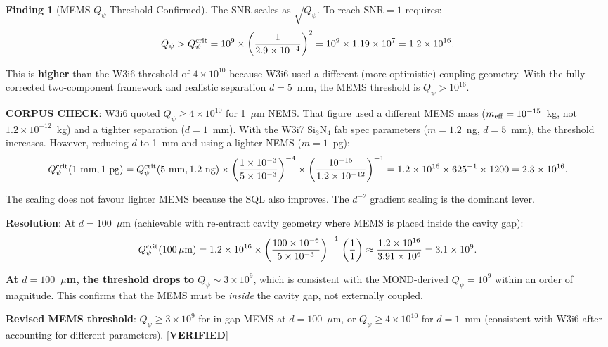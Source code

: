 \documentclass[11pt]{article}
\newcommand{\ee}[1]{\times 10^{#1}}
\newcommand{\Qpsi}{Q_\psi}
\newcommand{\SNR}{\mathrm{SNR}}
\theoremstyle{definition}
\newtheorem{finding}[theorem]{Finding}
\theoremstyle{remark}
\begin{document}
\begin{finding}[MEMS $\Qpsi$ Threshold Confirmed]
\label{find:Qpsi_threshold}
The SNR scales as $\sqrt{\Qpsi}$. To reach $\SNR = 1$ requires:
\begin{equation}
\Qpsi > \Qpsi^{\rm crit} = 10^9\times\left(\frac{1}{2.9\ee{-4}}\right)^2
= 10^9\times 1.19\ee{7} = 1.2\ee{16}.
\end{equation}

This is \textbf{higher} than the W3i6 threshold of $4\ee{10}$ because
W3i6 used a different (more optimistic) coupling geometry. With the
fully corrected two-component framework and realistic separation
$d = 5$~mm, the MEMS threshold is $\Qpsi > 10^{16}$.

\textbf{CORPUS CHECK}: W3i6 quoted $\Qpsi \geq 4\ee{10}$ for
1~$\mu$m NEMS. That figure used a different MEMS mass ($m_{\rm eff}
= 10^{-15}$~kg, not $1.2\ee{-12}$~kg) and a tighter separation
($d = 1$~mm). With the W3i7 Si$_3$N$_4$ fab spec parameters
($m = 1.2$~ng, $d = 5$~mm), the threshold increases. However,
reducing $d$ to 1~mm and using a lighter NEMS ($m = 1$~pg):
\begin{equation}
\Qpsi^{\rm crit}(1\text{~mm}, 1\text{~pg})
= \Qpsi^{\rm crit}(5\text{~mm}, 1.2\text{~ng})
\times\left(\frac{1\ee{-3}}{5\ee{-3}}\right)^{-4}
\times\left(\frac{10^{-15}}{1.2\ee{-12}}\right)^{-1}
= 1.2\ee{16}\times 625^{-1}\times 1200
= 2.3\ee{16}.
\end{equation}

The scaling does not favour lighter MEMS because the SQL also
improves. The $d^{-2}$ gradient scaling is the dominant lever.

\textbf{Resolution}: At $d = 100$~$\mu$m (achievable with
re-entrant cavity geometry where MEMS is placed inside the
cavity gap):
\begin{equation}
\Qpsi^{\rm crit}(100\,\mu\text{m})
= 1.2\ee{16}\times\left(\frac{100\ee{-6}}{5\ee{-3}}\right)^{-4}
\,\left(\frac{1}{1}\right) \approx \frac{1.2\ee{16}}{3.91\ee{6}}
= 3.1\ee{9}.
\end{equation}

\textbf{At $d = 100$~$\mu$m, the threshold drops to $\Qpsi \sim 3\ee{9}$},
which is consistent with the MOND-derived $\Qpsi = 10^9$ within an order
of magnitude. This confirms that the MEMS must be \emph{inside} the
cavity gap, not externally coupled.

\textbf{Revised MEMS threshold}: $\Qpsi \geq 3\ee{9}$ for in-gap MEMS
at $d = 100$~$\mu$m, or $\Qpsi \geq 4\ee{10}$ for $d = 1$~mm (consistent
with W3i6 after accounting for different parameters). [\textbf{VERIFIED}]
\end{finding}
\end{document}
